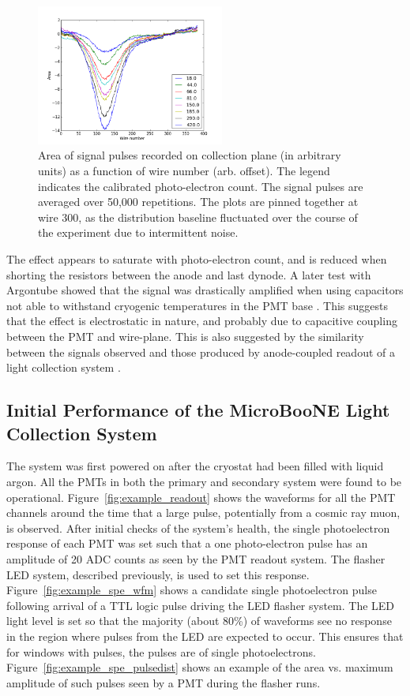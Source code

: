 \begin{figure}
\centering 
\includegraphics[width=0.55\textwidth]{./figures/PMT_xtalk_PE_plot.png}
\caption{Area of signal pulses recorded on collection plane (in arbitrary units) as a function of wire number (arb. offset). The legend indicates the calibrated photo-electron count. The signal pulses are averaged over 50,000 repetitions. The plots are pinned together at wire 300, as the distribution baseline fluctuated over the course of the experiment due to intermittent noise.
 \label{fig:PMTxtalk}  }
\end{figure}


The effect appears to saturate with photo-electron count, and is reduced when shorting the resistors between the anode and last dynode. A later test with Argontube showed that the signal was drastically amplified when using capacitors not able to withstand cryogenic temperatures in the PMT base \cite{BernPrivate}. This suggests that the effect is electrostatic in nature, and probably due to capacitive coupling between the PMT and wire-plane.  This is also suggested by the similarity between the signals observed and those produced by anode-coupled readout of a light collection system \cite{Moss:2015hha}.

\subsection{Initial Performance of the MicroBooNE Light Collection System}

The system was first powered on after the cryostat had been filled with liquid argon.  All the PMTs in both the primary and secondary system were found to be operational.  Figure~\ref{fig:example_readout} shows the waveforms for all the PMT channels around the time that a large pulse, potentially from a cosmic ray muon, is observed.  After initial checks of the system's health, the single photoelectron response of each PMT was set such that a one photo-electron pulse has an amplitude of 20 ADC counts as seen by the PMT readout system.  The flasher LED system, described previously, is used to set this response. Figure~\ref{fig:example_spe_wfm} shows a candidate single photoelectron pulse following arrival of a TTL logic pulse driving the LED flasher system.  The LED light level is set so that the majority (about 80\%) of waveforms see no response in the region where pulses from the LED are expected to occur.  This ensures that for windows with pulses, the pulses are of single photoelectrons.  Figure~\ref{fig:example_spe_pulsedist} shows an example of the area vs. maximum amplitude of such pulses seen by a PMT during the flasher runs.

